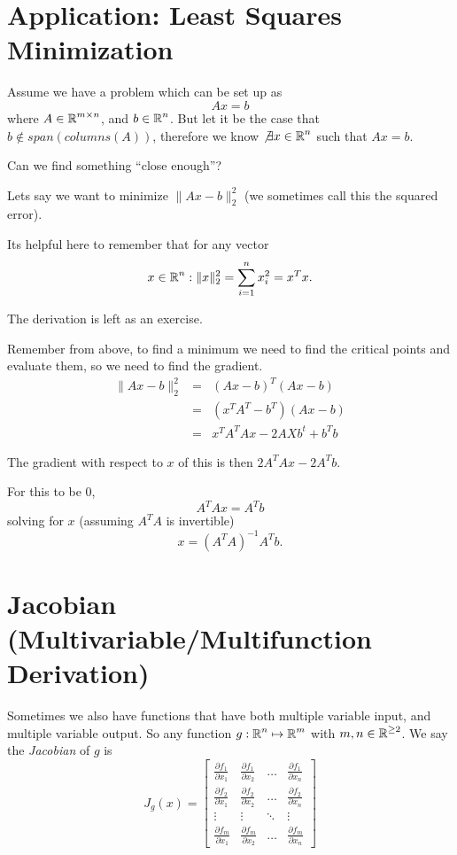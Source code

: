 \section{Application: Least Squares Minimization}
Assume we have a problem which can be set up as 
\[Ax=b\]
where $A\in\operatorname{\mathbb{R}}^{m\times n}$, and $b\in\operatorname{\mathbb{R}}^n$.
But let it be the case that $b\notin span(columns(A))$,
therefore we know $\not\exists x\in\operatorname{\mathbb{R}}^n$ such that $Ax=b$.

Can we find something ``close enough''?

Lets say we want to minimize $\|Ax-b\|_2^2$ (we sometimes call this the squared error). 
\begin{aside}
Its helpful here to remember that for any vector \[x\in\operatorname{\mathbb{R}}^n: \|x\|_2^2 = \sum_{i=1}^n x_i^2 = x^Tx.\]

The derivation is left as an exercise.
\end{aside}

Remember from above, to find a minimum we need to find the critical points and evaluate them, so we need to find the gradient. 
\[\begin{array}{ccc}
\|Ax-b\|_2^2 & = & (Ax-b)^T(Ax-b)\\
& = & (x^TA^T-b^T)(Ax-b)\\
& = & x^TA^TAx-2AXb^t+b^Tb
\end{array}\]

The gradient with respect to $x$ of this is then $2A^TAx-2A^Tb$.

For this to be 0, \[A^TAx=A^Tb\]
solving for $x$ (assuming $A^TA$ is invertible)
\[x = (A^TA)^{-1}A^Tb.\]


\section{Jacobian (Multivariable/Multifunction Derivation)}
Sometimes we also have functions that have both multiple variable input, and multiple variable output. 
So any function $g: \operatorname{\mathbb{R}}^n\mapsto\operatorname{\mathbb{R}}^m$ with $m,n\in\operatorname{\mathbb{R}}^{\ge2}$.
We say the \emph{Jacobian} of $g$ is 
\[J_g(x) = \begin{bmatrix}
\frac{\partial f_1}{\partial x_1} & \frac{\partial f_1}{\partial x_2} & \hdots & \frac{\partial f_1}{\partial x_n} \\  
\frac{\partial f_2}{\partial x_1} & \frac{\partial f_2}{\partial x_2} & \hdots & \frac{\partial f_2}{\partial x_n} \\  
\vdots & \vdots & \ddots & \vdots\\
\frac{\partial f_m}{\partial x_1} & \frac{\partial f_m}{\partial x_2} & \hdots & \frac{\partial f_m}{\partial x_n} \end{bmatrix}\]

